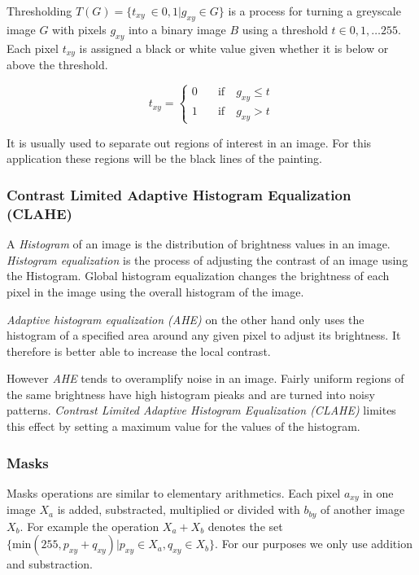 \documentclass[serif,article,noparskip]{agse-thesis}
\begin{document}
Thresholding $T(G) = \{t_{xy}\ \in {0,1} | g_{xy} \in G\}$ is a process for turning a greyscale image $G$
with pixels $g_{xy}$ into a binary image $B$ using a threshold $t \in
0,1,\dots255$. Each pixel $t_{xy}$ is assigned a black or white value given
whether it is below or above the threshold.

\begin{equation}
  t_{xy} =
  \begin{cases}
    0 & \quad  \text{if}  \quad g_{xy} \leq t\\
    1  & \quad \text{if}  \quad g_{xy} > t
  \end{cases}
\end{equation}

It is usually used to separate out regions of interest in an image. For this
application these regions will be the black lines of the painting.

\subsubsection{Contrast Limited Adaptive Histogram
Equalization (CLAHE)}

A \textit{Histogram} of an image is the distribution of brightness values in an
image. \textit{Histogram equalization} is the process of adjusting the contrast
of an image using the Histogram. Global histogram equalization changes the
brightness of each pixel in the image using the overall histogram of the image.
\cite{ShapiroLindaG2001Cv}

\textit{Adaptive histogram equalization (AHE)} on the other hand only uses the
histogram of a specified area around any given pixel to adjust its brightness. It
therefore is better able to increase the local contrast.

However \textit{AHE} tends to overamplify noise in an image. Fairly uniform
regions of the same brightness have high histogram pieaks and are turned into
noisy patterns.  \textit{Contrast Limited Adaptive Histogram Equalization
(CLAHE)} limites this effect by setting a maximum value for the values of the
histogram. \cite{Pizer1987}

\subsubsection{Masks}

Masks operations are similar to elementary arithmetics. Each pixel $a_{xy}$ in
one image  $X_a$ is added, substracted, multiplied or divided with $b_{by}$ of
another image $X_b$. For example the operation $X_a + X_b$ denotes the set
$\{\mathrm{min}(255, p_{xy} + q_{xy}) | p_{xy} \in X_a, q_{xy} \in X_b\}$. For our purposes we only
use addition and substraction.
\end{document}
